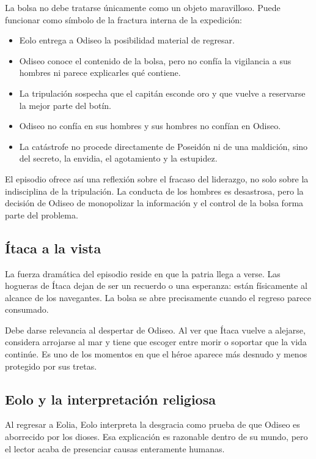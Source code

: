 La bolsa no debe tratarse únicamente como un objeto maravilloso. Puede
funcionar como símbolo de la fractura interna de la expedición:

\begin{itemize}
\item Eolo entrega a Odiseo la posibilidad material de regresar.
\item Odiseo conoce el contenido de la bolsa, pero no confía la vigilancia a
      sus hombres ni parece explicarles qué contiene.
\item La tripulación sospecha que el capitán esconde oro y que vuelve a
      reservarse la mejor parte del botín.
\item Odiseo no confía en sus hombres y sus hombres no confían en Odiseo.
\item La catástrofe no procede directamente de Poseidón ni de una maldición,
      sino del secreto, la envidia, el agotamiento y la estupidez.
\end{itemize}

El episodio ofrece así una reflexión sobre el fracaso del liderazgo, no solo
sobre la indisciplina de la tripulación. La conducta de los hombres es
desastrosa, pero la decisión de Odiseo de monopolizar la información y el
control de la bolsa forma parte del problema.

\subsection*{Ítaca a la vista}

La fuerza dramática del episodio reside en que la patria llega a verse. Las
hogueras de Ítaca dejan de ser un recuerdo o una esperanza: están físicamente
al alcance de los navegantes. La bolsa se abre precisamente cuando el regreso
parece consumado.

Debe darse relevancia al despertar de Odiseo. Al ver que Ítaca vuelve a
alejarse, considera arrojarse al mar y tiene que escoger entre morir o soportar
que la vida continúe. Es uno de los momentos en que el héroe aparece más
desnudo y menos protegido por sus tretas.

\subsection*{Eolo y la interpretación religiosa}

Al regresar a Eolia, Eolo interpreta la desgracia como prueba de que Odiseo es
aborrecido por los dioses. Esa explicación es razonable dentro de su mundo,
pero el lector acaba de presenciar causas enteramente humanas.

